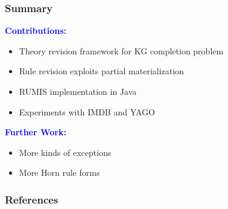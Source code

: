 \documentclass{beamer}
\newcommand{\bl}[1]{\textcolor{blue}{#1}}
\begin{document}
\begin{frame} \frametitle{Summary}
\textbf{\bl{Contributions:}}
\begin{itemize}
\item Theory revision framework for KG completion problem
\item Rule revision exploits partial materialization
\item RUMIS implementation in Java
\item Experiments with IMDB and YAGO
\end{itemize}
\bigskip
\bigskip

\textbf{\bl{Further Work:}}
\begin{itemize}
\item More kinds of exceptions
\item More Horn rule forms
\end{itemize}
\end{frame}

\begin{frame}
  \frametitle{References}
  
 \tiny{}
\end{frame}
\end{document}
